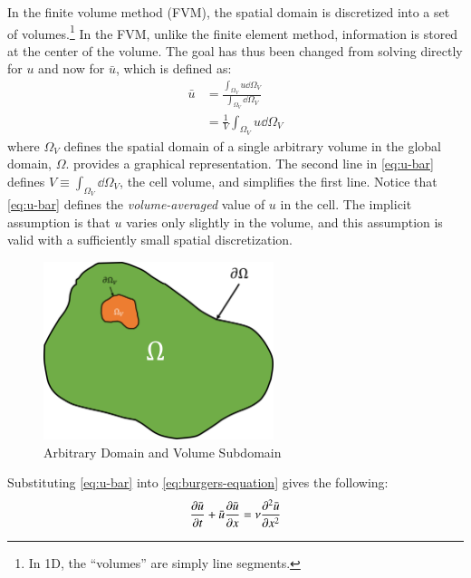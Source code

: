In the finite volume method (FVM), the spatial domain is discretized into a set of volumes.\footnote{In 1D, the ``volumes'' are simply line segments.}
In the FVM, unlike the finite element method, information is stored at the center of the volume.
The goal has thus been changed from solving directly for $u$ and now for $\bar{u}$, which is defined as:
\begin{equation}
	\label{eq:u-bar}
	\begin{split}
		\bar{u}&=\frac{\int_{\Omega_V} u \dd \Omega_V }{\int_{\Omega_V}\dd \Omega_V }\\
		&=\frac{1}{V}\int_{\Omega_V} u \dd \Omega_V
	\end{split}
\end{equation}
where $\Omega_V$ defines the spatial domain of a single arbitrary volume in the global domain, $\Omega$.
 provides a graphical representation.
The second line in \cref{eq:u-bar} defines $V\equiv\int_{\Omega_V}\dd \Omega_V $, the cell volume, and simplifies the first line.
Notice that \cref{eq:u-bar} defines the \textit{volume-averaged} value of $u$ in the cell.
The implicit assumption is that $u$ varies only slightly in the volume, and this assumption is valid with a sufficiently small spatial discretization.
\begin{figure}
	\centering
	\includegraphics[width=0.6\textwidth]{figures/domain_subdomain}
	\caption{Arbitrary Domain and Volume Subdomain}
	\label{fig:domain and subdomain}
\end{figure}
Substituting \cref{eq:u-bar} into \cref{eq:burgers-equation} gives the following:
\begin{equation}
	\label{eq:u-averaged-burgers}
	\pdv{\bar{u}}{t} + \bar{u}\pdv{\bar{u}}{x} = \nu \pdv[2]{\bar{u}}{x}
\end{equation}

